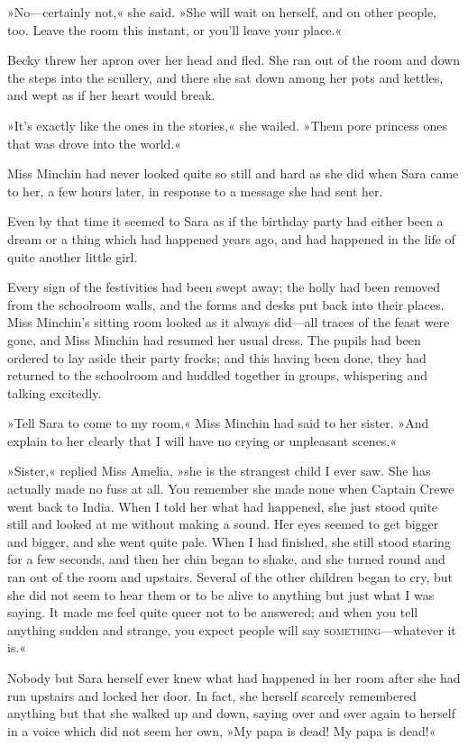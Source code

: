 »No—certainly not,« she said. »She will wait on herself, and on other people, too. Leave the room this instant, or you'll leave your place.«

Becky threw her apron over her head and fled. She ran out of the room and down the steps into the scullery, and there she sat down among her pots and kettles, and wept as if her heart would break.

»It's exactly like the ones in the stories,« she wailed. »Them pore princess ones that was drove into the world.«

Miss Minchin had never looked quite so still and hard as she did when Sara came to her, a few hours later, in response to a message she had sent her.

Even by that time it seemed to Sara as if the birthday party had either been a dream or a thing which had happened years ago, and had happened in the life of quite another little girl.

Every sign of the festivities had been swept away; the holly had been removed from the schoolroom walls, and the forms and desks put back into their places. Miss Minchin's sitting room looked as it always did—all traces of the feast were gone, and Miss Minchin had resumed her usual dress. The pupils had been ordered to lay aside their party frocks; and this having been done, they had returned to the schoolroom and huddled together in groups, whispering and talking excitedly.

»Tell Sara to come to my room,« Miss Minchin had said to her sister. »And explain to her clearly that I will have no crying or unpleasant scenes.«

»Sister,« replied Miss Amelia, »she is the strangest child I ever saw. She has actually made no fuss at all. You remember she made none when Captain Crewe went back to India. When I told her what had happened, she just stood quite still and looked at me without making a sound. Her eyes seemed to get bigger and bigger, and she went quite pale. When I had finished, she still stood staring for a few seconds, and then her chin began to shake, and she turned round and ran out of the room and upstairs. Several of the other children began to cry, but she did not seem to hear them or to be alive to anything but just what I was saying. It made me feel quite queer not to be answered; and when you tell anything sudden and strange, you expect people will say \textsc{something}—whatever it is.«

Nobody but Sara herself ever knew what had happened in her room after she had run upstairs and locked her door. In fact, she herself scarcely remembered anything but that she walked up and down, saying over and over again to herself in a voice which did not seem her own, »My papa is dead! My papa is dead!«

